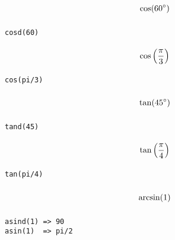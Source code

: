 \documentclass
[
  fontsize = 11pt,
  parskip  = half-,
  BCOR     = 0pt,
  DIV      = 11,
  ngerman
]
{scrartcl}
\begin{document}
\begin{minipage}{\mw}
  \begin{equation*}
    \vphantom{\bigg(}%
    \cos(60^\circ)
  \end{equation*}
\end{minipage}%
\hfill
\begin{minipage}{\cw}
\begin{verbatim}
cosd(60)
\end{verbatim}
\end{minipage}
\begin{minipage}{\mw}
  \begin{equation*}
    \vphantom{\bigg(}%
    \cos\left(\frac{\pi}{3}\right)
  \end{equation*}
\end{minipage}%
\hfill
\begin{minipage}{\cw}
\begin{verbatim}
cos(pi/3)
\end{verbatim}
\end{minipage}

\begin{minipage}{\mw}
  \begin{equation*}
    \vphantom{\bigg(}%
    \tan(45^\circ)
  \end{equation*}
\end{minipage}%
\hfill
\begin{minipage}{\cw}
\begin{verbatim}
tand(45)
\end{verbatim}
\end{minipage}
\begin{minipage}{\mw}
  \begin{equation*}
    \vphantom{\bigg(}%
    \tan\left(\frac{\pi}{4}\right)
  \end{equation*}
\end{minipage}%
\hfill
\begin{minipage}{\cw}
\begin{verbatim}
tan(pi/4)
\end{verbatim}
\end{minipage}

\begin{minipage}{\mw}
  \begin{equation*}
    \vphantom{\bigg(}%
    \arcsin(1)
  \end{equation*}
\end{minipage}%
\hfill
\begin{minipage}{\cw}
\begin{verbatim}
asind(1) => 90
asin(1)  => pi/2
\end{verbatim}
\end{minipage}
\end{document}
